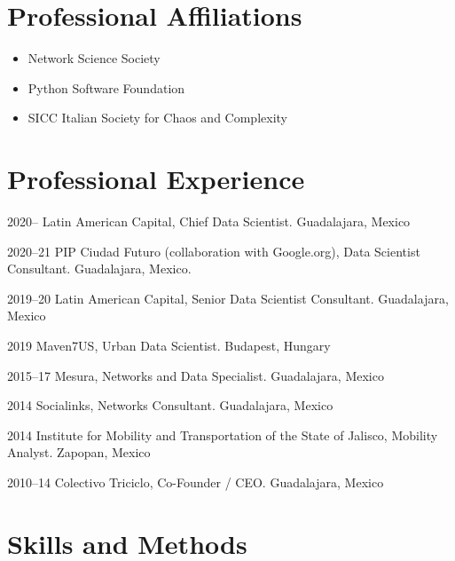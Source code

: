 \documentclass{academiccv}
\begin{document}
\section*{Professional Affiliations}
\begin{itemize}
	\item Network Science Society
	\item Python Software Foundation
	\item SICC Italian Society for Chaos and Complexity
\end{itemize}


\section*{Professional Experience}
\begin{tablist}
	\item[2020-- ] \tab Latin American Capital, Chief Data Scientist. Guadalajara, Mexico
	\item[2020--21] \tab PIP Ciudad Futuro (collaboration with Google.org), Data Scientist Consultant. Guadalajara, Mexico. 
	\item[2019--20] \tab Latin American Capital, Senior Data Scientist Consultant. Guadalajara, Mexico
	\item[2019] \tab Maven7US, Urban Data Scientist. Budapest, Hungary
	\item[2015--17] \tab Mesura, Networks and Data Specialist. Guadalajara, Mexico
	\item[2014] \tab Socialinks, Networks Consultant. Guadalajara, Mexico
	\item[2014] \tab Institute for Mobility and Transportation of the State of Jalisco, Mobility Analyst. Zapopan, Mexico
	\item[2010--14] \tab Colectivo Triciclo, Co-Founder / CEO. Guadalajara, Mexico
\end{tablist}


\section*{Skills and Methods}
\end{document}
